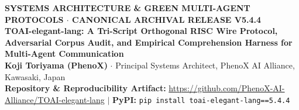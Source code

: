 \documentclass[9pt,a4paper]{extarticle}
\begin{document}
\begin{center}
  {\footnotesize\sffamily\bfseries\color{tealrule} SYSTEMS ARCHITECTURE \& GREEN MULTI-AGENT PROTOCOLS $\cdot$ CANONICAL ARCHIVAL RELEASE V5.4.4}\\[1.0pt]
  {\Large\bfseries\sffamily\color{navyheader} TOAI-elegant-lang: A Tri-Script Orthogonal RISC Wire Protocol, Adversarial Corpus Audit, and Empirical Comprehension Harness for Multi-Agent Communication}\\[1.5pt]
  {\normalsize\bfseries Koji Toriyama (PhenoX)} $\cdot$ {\small Principal Systems Architect, PhenoX AI Alliance, Kawasaki, Japan}\\
  {\footnotesize\sffamily\bfseries Repository \& Reproducibility Artifact:} {\footnotesize\url{https://github.com/PhenoX-AI-Alliance/TOAI-elegant-lang} $|$ \textbf{PyPI:} \texttt{pip install toai-elegant-lang==5.4.4}}
\end{center}
\end{document}
